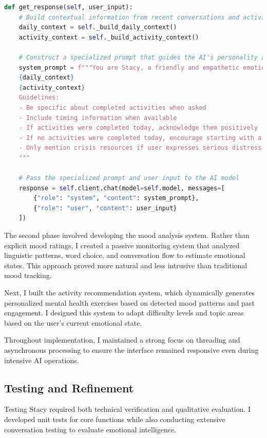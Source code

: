 \documentclass[12pt]{article}
\begin{document}
\begin{lstlisting}[language=Python, caption=AI Response System Design]
def get_response(self, user_input):
    # Build contextual information from recent conversations and activities
    daily_context = self._build_daily_context()
    activity_context = self._build_activity_context()
    
    # Construct a specialized prompt that guides the AI's personality and approach
    system_prompt = f"""You are Stacy, a friendly and empathetic emotional AI Healthcare Assistant.
    {daily_context}
    {activity_context}
    Guidelines:
    - Be specific about completed activities when asked
    - Include timing information when available
    - If activities were completed today, acknowledge them positively
    - If no activities were completed today, encourage starting with a simple one
    - Only mention crisis resources if user expresses serious distress
    """
    
    # Pass the specialized prompt and user input to the AI model
    response = self.client.chat(model=self.model, messages=[
        {"role": "system", "content": system_prompt},
        {"role": "user", "content": user_input}
    ])
\end{lstlisting}

The second phase involved developing the mood analysis system. Rather than explicit mood ratings, I created a passive monitoring system that analyzed linguistic patterns, word choice, and conversation flow to estimate emotional states. This approach proved more natural and less intrusive than traditional mood tracking.

Next, I built the activity recommendation system, which dynamically generates personalized mental health exercises based on detected mood patterns and past engagement. I designed this system to adapt difficulty levels and topic areas based on the user's current emotional state.

Throughout implementation, I maintained a strong focus on threading and asynchronous processing to ensure the interface remained responsive even during intensive AI operations.

\subsection{Testing and Refinement}

Testing Stacy required both technical verification and qualitative evaluation. I developed unit tests for core functions while also conducting extensive conversation testing to evaluate emotional intelligence.
\end{document}
